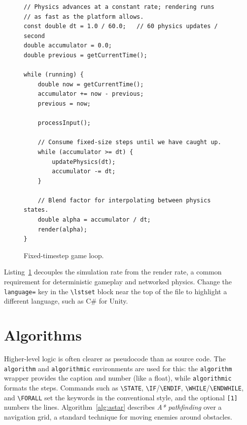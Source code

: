 \documentclass[a4paper,twoside,twocolumn]{IEEEtran}
\begin{document}
\begin{figure}[t]
\centering
\begin{lstlisting}
// Physics advances at a constant rate; rendering runs
// as fast as the platform allows.
const double dt = 1.0 / 60.0;   // 60 physics updates / second
double accumulator = 0.0;
double previous = getCurrentTime();

while (running) {
    double now = getCurrentTime();
    accumulator += now - previous;
    previous = now;

    processInput();

    // Consume fixed-size steps until we have caught up.
    while (accumulator >= dt) {
        updatePhysics(dt);
        accumulator -= dt;
    }

    // Blend factor for interpolating between physics states.
    double alpha = accumulator / dt;
    render(alpha);
}
\end{lstlisting}
\caption{Fixed-timestep game loop.}
\label{lst:gameloop}
\end{figure}

Listing~\ref{lst:gameloop} decouples the simulation rate from the render rate,
a common requirement for deterministic gameplay and networked physics. Change
the \verb|language=| key in the \verb|\lstset| block near the top of the file to
highlight a different language, such as C\# for Unity.



\section{Algorithms}
\label{sec:algorithms}

Higher-level logic is often clearer as pseudocode than as source code. The
\texttt{algorithm} and \texttt{algorithmic} environments are used for this: the
\texttt{algorithm} wrapper provides the caption and number (like a float), while
\texttt{algorithmic} formats the steps. Commands such as \verb|\STATE|,
\verb|\IF|/\verb|\ENDIF|, \verb|\WHILE|/\verb|\ENDWHILE|, and \verb|\FORALL| set
the keywords in the conventional style, and the optional \verb|[1]| numbers the
lines. Algorithm~\ref{alg:astar} describes \emph{A* pathfinding} over a
navigation grid, a standard technique for moving enemies around obstacles.
\end{document}
